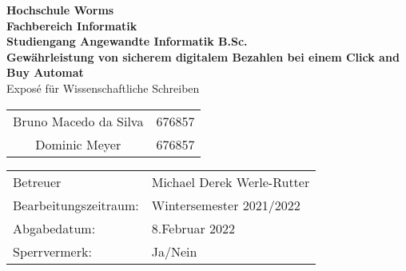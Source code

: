 \begin{titlepage}
    \vspace*{2mm}
    \begin{center}
        \Large
        \textbf{Hochschule Worms}\\
        \textbf{Fachbereich Informatik}\\
        \textbf{Studiengang Angewandte Informatik B.Sc.}\\
        \vspace{1cm}
        \textbf{Gewährleistung von sicherem digitalem Bezahlen bei einem Click and Buy Automat}\\
        \vspace{1cm}
        \large
        Exposé für Wissenschaftliche Schreiben\\
        \vspace{1cm}
        \begin {table}[ht]
            \centering
            \begin{tabular}{c c}
                Bruno Macedo da Silva   & 676857 \\
                Dominic Meyer           & 676857 \\
            \end{tabular}
        \end {table}
        \vspace{3cm}
        \large
        \vspace{6cm}
         \begin {table}[ht]
             \centering
             \begin{tabular}{l l}
                Betreuer                & Michael Derek Werle-Rutter \\
                Bearbeitungszeitraum:   & Wintersemester 2021/2022 \\
                Abgabedatum:            & 8.Februar 2022 \\
                Sperrvermerk:           & Ja/Nein \\
             \end{tabular}
         \end {table}
    \end{center}
    \normalsize
    \vfill
 


\end{titlepage}